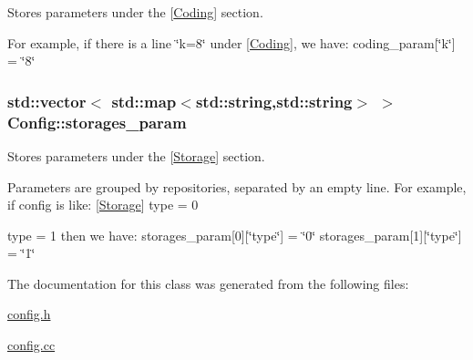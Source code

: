 \-Stores parameters under the \mbox{[}\hyperlink{classCoding}{\-Coding}\mbox{]} section. 

\-For example, if there is a line \char`\"{}k=8\char`\"{} under \mbox{[}\hyperlink{classCoding}{\-Coding}\mbox{]}, we have\-: coding\-\_\-param\mbox{[}\char`\"{}k\char`\"{}\mbox{]} = \char`\"{}8\char`\"{} \hypertarget{classConfig_a14078fe6fc46cb6c5bd1a3c3b9a4eb24}{
\subsubsection[{storages\-\_\-param}]{\setlength{\rightskip}{0pt plus 5cm}std\-::vector$<$ std\-::map$<$std\-::string,std\-::string$>$ $>$ {\bf \-Config\-::storages\-\_\-param}}}\label{classConfig_a14078fe6fc46cb6c5bd1a3c3b9a4eb24}


\-Stores parameters under the \mbox{[}\hyperlink{classStorage}{\-Storage}\mbox{]} section. 

\-Parameters are grouped by repositories, separated by an empty line. \-For example, if config is like\-: \mbox{[}\hyperlink{classStorage}{\-Storage}\mbox{]} type = 0

type = 1 then we have\-: storages\-\_\-param\mbox{[}0\mbox{]}\mbox{[}\char`\"{}type\char`\"{}\mbox{]} = \char`\"{}0\char`\"{} storages\-\_\-param\mbox{[}1\mbox{]}\mbox{[}\char`\"{}type\char`\"{}\mbox{]} = \char`\"{}1\char`\"{} 

\-The documentation for this class was generated from the following files\-:\begin{DoxyCompactItemize}
\item 
\hyperlink{config_8h}{config.\-h}\item 
\hyperlink{config_8cc}{config.\-cc}\end{DoxyCompactItemize}
